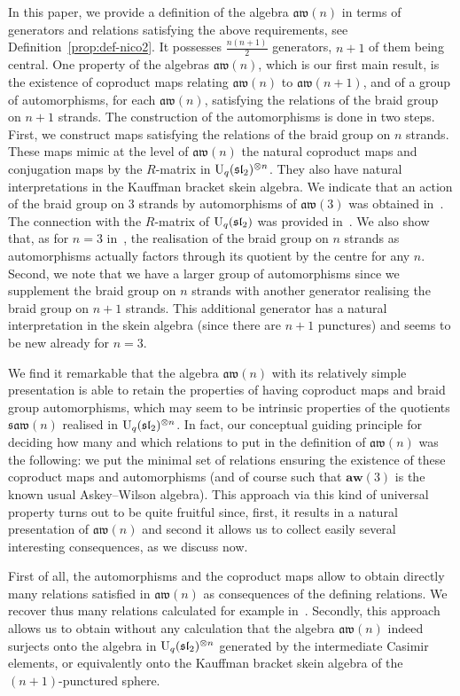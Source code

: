 \documentclass[10pt,a4paper]{amsart}
\numberwithin{equation}{section}
\theoremstyle{definition}
\newcommand{\aw}{\mathfrak{aw}(n)}
\newcommand{\saw}{\mathfrak{saw}(n)}
\begin{document}
In this paper, we provide a definition of the algebra $\aw$ in terms of generators and relations satisfying the above requirements, see Definition~\ref{prop:def-nico2}.
It possesses $\frac{n(n+1)}2$ generators, $n+1$ of them being central.
One property of the algebras $\aw$, which is our first main result, is the existence of coproduct maps relating $\aw$ to $\mathfrak{aw}(n+1)$,
and of a group of automorphisms, for each $\aw$, satisfying the relations of the braid group on $n+1$ strands.
The construction of the automorphisms is done in two steps. First, we construct maps satisfying the relations of the braid group on $n$ strands.
These maps mimic at the level of $\aw$ the natural coproduct maps and conjugation maps by the $R$-matrix in ${\rm U}_q(\mathfrak{sl}_2)^{\otimes n}$. They also have natural interpretations in the Kauffman bracket skein algebra. We indicate that an action of the braid group on $3$ strands by automorphisms of $\mathfrak{aw}(3)$ was obtained in~\cite{Ter}. The connection with the $R$-matrix of ${\rm U}_q(\mathfrak{sl}_2)$ was provided in~\cite{CGVZ}. We also show that, as for $n=3$ in~\cite{Ter}, the realisation of the braid group on $n$ strands as automorphisms actually factors through its quotient by the centre for any $n$. Second, we note that we have a larger group of automorphisms since we supplement the braid group on $n$ strands with another generator realising the braid group on $n+1$ strands. This additional generator has a natural interpretation in the skein algebra (since there are $n+1$ punctures) and seems to be new already for $n=3$.

We find it remarkable that the algebra $\aw$ with its relatively simple presentation is able to retain the properties of having coproduct maps and braid group automorphisms, which may seem to be intrinsic properties of the quotients $\saw$ realised in ${\rm U}_q(\mathfrak{sl}_2)^{\otimes n}$. In fact, our conceptual guiding principle for deciding how many and which relations to put in the definition of $\aw$ was the following: we put the minimal set of relations ensuring the existence of these coproduct maps and automorphisms (and of course such that $\textbf{aw}(3)$ is the known usual Askey--Wilson algebra). This approach via this kind of universal property turns out to be quite fruitful since, first, it results in a natural presentation of $\aw$ and second it allows us to collect easily several interesting consequences, as we discuss now.

First of all, the automorphisms and the coproduct maps allow to obtain directly many relations satisfied in $\aw$ as consequences of the defining relations.
We recover thus many relations calculated for example in~\cite{CL, DeC, PostWalt}. Secondly, this approach allows us to obtain without any calculation that the algebra $\aw$ indeed surjects onto the algebra in ${\rm U}_q(\mathfrak{sl}_2)^{\otimes n}$
generated by the intermediate Casimir elements, or equivalently onto the Kauffman bracket skein algebra of the $(n+1)$-punctured sphere.
\end{document}
